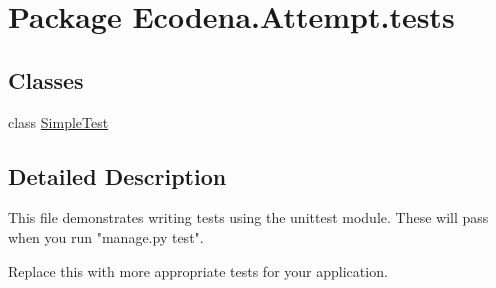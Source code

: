 \hypertarget{namespace_ecodena_1_1_attempt_1_1tests}{
\section{Package Ecodena.Attempt.tests}
\label{d1/d39/namespace_ecodena_1_1_attempt_1_1tests}
}
\subsection*{Classes}
\begin{DoxyCompactItemize}
\item 
class \hyperlink{class_ecodena_1_1_attempt_1_1tests_1_1_simple_test}{SimpleTest}
\end{DoxyCompactItemize}


\subsection{Detailed Description}
\begin{DoxyVerb}
This file demonstrates writing tests using the unittest module. These will pass
when you run "manage.py test".

Replace this with more appropriate tests for your application.
\end{DoxyVerb}
 
